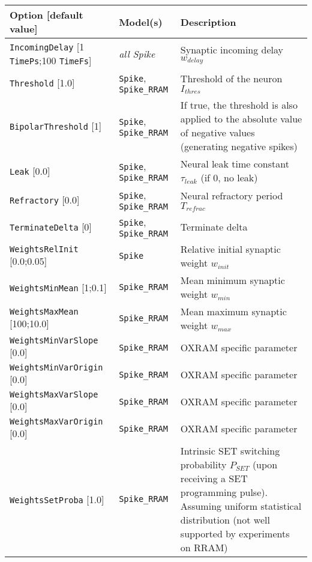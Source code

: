 \documentclass[a4paper,11pt,oneside]{article}
\begin{document}
\begin{center}
 \begin{longtable}{| p{4cm} | p{3cm} | p{9cm} | }
 \hline
 Option [default value] & Model(s) & Description\\
 \hline\hline
  \lstinline!IncomingDelay! [1 \lstinline!TimePs!;100 \lstinline!TimeFs!]
    & \emph{all Spike} & Synaptic incoming delay $w_{delay}$ \\
  \lstinline!Threshold! [1.0] & \lstinline!Spike!, \lstinline!Spike_RRAM!
    & Threshold of the neuron $I_{thres}$ \\
  \lstinline!BipolarThreshold! [1] & \lstinline!Spike!, \lstinline!Spike_RRAM!
    & If true, the threshold is also applied to the absolute value of negative
   values (generating negative spikes) \\
  \lstinline!Leak! [0.0] & \lstinline!Spike!, \lstinline!Spike_RRAM!
    & Neural leak time constant $\tau_{leak}$ (if 0, no leak) \\
  \lstinline!Refractory! [0.0] & \lstinline!Spike!, \lstinline!Spike_RRAM!
    & Neural refractory period $T_{refrac}$ \\
  \lstinline!TerminateDelta! [0] & \lstinline!Spike!, \lstinline!Spike_RRAM!
    & Terminate delta \\
  \lstinline!WeightsRelInit! [0.0;0.05] & \lstinline!Spike!
    & Relative initial synaptic weight $w_{init}$ \\
  \lstinline!WeightsMinMean! [1;0.1] & \lstinline!Spike_RRAM!
    & Mean minimum synaptic weight $w_{min}$ \\
  \lstinline!WeightsMaxMean! [100;10.0] & \lstinline!Spike_RRAM!
    & Mean maximum synaptic weight $w_{max}$ \\
  \lstinline!WeightsMinVarSlope! [0.0] & \lstinline!Spike_RRAM!
    & OXRAM specific parameter \\
  \lstinline!WeightsMinVarOrigin! [0.0] & \lstinline!Spike_RRAM!
    & OXRAM specific parameter \\
  \lstinline!WeightsMaxVarSlope! [0.0] & \lstinline!Spike_RRAM!
    & OXRAM specific parameter \\
  \lstinline!WeightsMaxVarOrigin! [0.0] & \lstinline!Spike_RRAM!
    & OXRAM specific parameter \\
  \lstinline!WeightsSetProba! [1.0] & \lstinline!Spike_RRAM!
    & Intrinsic SET switching probability $P_{SET}$ (upon receiving a SET
  programming pulse). Assuming uniform statistical distribution (not well
  supported by experiments on RRAM) \\

\end{longtable}
\end{center}
\end{document}
